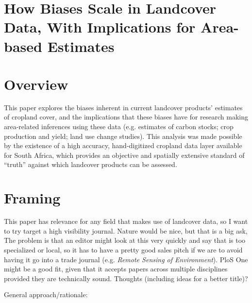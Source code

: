 \documentclass[11 pt]{article}
\begin{document}
\pagestyle{empty}

{\centering\section*{How Biases Scale in Landcover Data, With Implications for Area-based Estimates}}

\section*{Overview}
This paper explores the biases inherent in current landcover products' estimates of cropland cover, and the implications that these biases have for research making area-related inferences using these data (e.g. estimates of carbon stocks; crop production and yield; land use change studies). This analysis was made possible by the existence of a high accuracy, hand-digitized cropland data layer available for South Africa, which provides an objective and spatially extensive standard of ``truth'' against which landcover products can be assessed.  

\section*{Framing}
This paper has relevance for any field that makes use of landcover data, so I want to try target a high visibility journal. Nature would be nice, but that is a big ask, The problem is that an editor might look at this very quickly and say that is too specialized or local, so it has to have a pretty good sales pitch if we are to avoid having it go into a trade journal (e.g. \emph{Remote Sensing of Environment}). PloS One might be a good fit, given that it accepts papers across multiple disciplines provided they are technically sound. Thoughts (including ideas for a better title)?  

General approach/rationale: 
\end{document}
